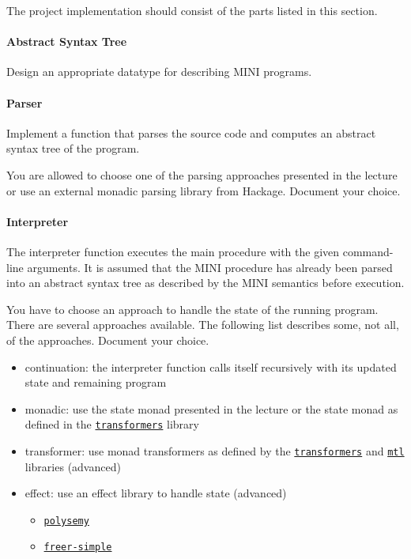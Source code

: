 \documentclass{article}
\begin{document}
The project implementation should consist of the parts listed in this section.

\paragraph{Abstract Syntax Tree}

Design an appropriate datatype for describing MINI programs.

\paragraph{Parser}

Implement a function that parses the source code and computes an abstract syntax tree of the program.

You are allowed to choose one of the parsing approaches presented in the lecture or use an external monadic parsing library from Hackage. Document your choice.

\paragraph{Interpreter}

The interpreter function executes the main procedure with the given command-line arguments. It is assumed that the MINI procedure has already been parsed into an abstract syntax tree as described by the MINI semantics before execution.

You have to choose an approach to handle the state of the running program. There are several approaches available. The following list describes some, not all, of the approaches. Document your choice.

\begin{itemize}
\item continuation: the interpreter function calls itself recursively with its updated state and remaining program
\item monadic: use the state monad presented in the lecture or the state monad as defined in the \href{https://hackage.haskell.org/package/transformers}{\texttt{transformers}} library
\item transformer: use monad transformers as defined by the \href{https://hackage.haskell.org/package/transformers}{\texttt{transformers}} and \href{https://hackage.haskell.org/package/mtl}{\texttt{mtl}} libraries (advanced)
\item effect: use an effect library to handle state (advanced)
    \begin{itemize}
    \item \href{https://hackage.haskell.org/package/polysemy}{\texttt{polysemy}}
    \item \href{https://hackage.haskell.org/package/freer-simple}{\texttt{freer-simple}}
    \end{itemize}
\end{itemize}
\end{document}

